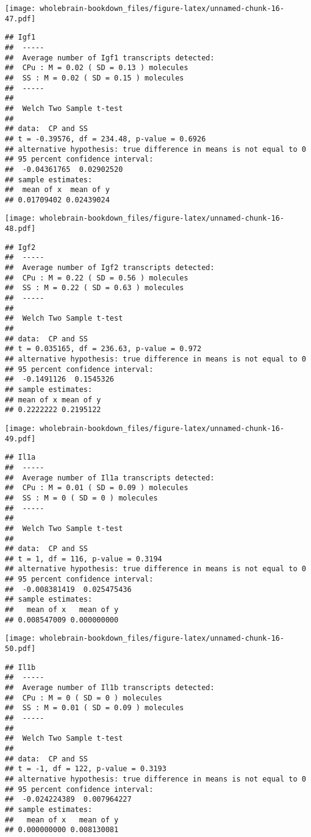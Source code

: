 \documentclass[]{book}
\theoremstyle{definition}
\theoremstyle{definition}
\theoremstyle{remark}
\begin{document}
\texttt{[image: wholebrain-bookdown\_files/figure-latex/unnamed-chunk-16-47.pdf]}

\begin{verbatim}
## Igf1
##  -----
##  Average number of Igf1 transcripts detected:
##  CPu : M = 0.02 ( SD = 0.13 ) molecules 
##  SS : M = 0.02 ( SD = 0.15 ) molecules
##  -----
## 
##  Welch Two Sample t-test
## 
## data:  CP and SS
## t = -0.39576, df = 234.48, p-value = 0.6926
## alternative hypothesis: true difference in means is not equal to 0
## 95 percent confidence interval:
##  -0.04361765  0.02902520
## sample estimates:
##  mean of x  mean of y 
## 0.01709402 0.02439024
\end{verbatim}

\texttt{[image: wholebrain-bookdown\_files/figure-latex/unnamed-chunk-16-48.pdf]}

\begin{verbatim}
## Igf2
##  -----
##  Average number of Igf2 transcripts detected:
##  CPu : M = 0.22 ( SD = 0.56 ) molecules 
##  SS : M = 0.22 ( SD = 0.63 ) molecules
##  -----
## 
##  Welch Two Sample t-test
## 
## data:  CP and SS
## t = 0.035165, df = 236.63, p-value = 0.972
## alternative hypothesis: true difference in means is not equal to 0
## 95 percent confidence interval:
##  -0.1491126  0.1545326
## sample estimates:
## mean of x mean of y 
## 0.2222222 0.2195122
\end{verbatim}

\texttt{[image: wholebrain-bookdown\_files/figure-latex/unnamed-chunk-16-49.pdf]}

\begin{verbatim}
## Il1a
##  -----
##  Average number of Il1a transcripts detected:
##  CPu : M = 0.01 ( SD = 0.09 ) molecules 
##  SS : M = 0 ( SD = 0 ) molecules
##  -----
## 
##  Welch Two Sample t-test
## 
## data:  CP and SS
## t = 1, df = 116, p-value = 0.3194
## alternative hypothesis: true difference in means is not equal to 0
## 95 percent confidence interval:
##  -0.008381419  0.025475436
## sample estimates:
##   mean of x   mean of y 
## 0.008547009 0.000000000
\end{verbatim}

\texttt{[image: wholebrain-bookdown\_files/figure-latex/unnamed-chunk-16-50.pdf]}

\begin{verbatim}
## Il1b
##  -----
##  Average number of Il1b transcripts detected:
##  CPu : M = 0 ( SD = 0 ) molecules 
##  SS : M = 0.01 ( SD = 0.09 ) molecules
##  -----
## 
##  Welch Two Sample t-test
## 
## data:  CP and SS
## t = -1, df = 122, p-value = 0.3193
## alternative hypothesis: true difference in means is not equal to 0
## 95 percent confidence interval:
##  -0.024224389  0.007964227
## sample estimates:
##   mean of x   mean of y 
## 0.000000000 0.008130081
\end{verbatim}
\end{document}
